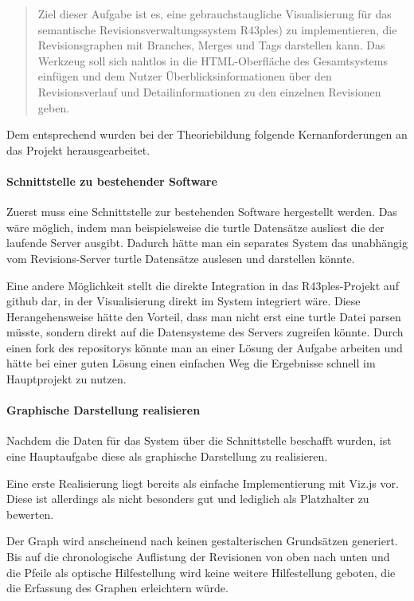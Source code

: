 \documentclass[color, ddc]{tudscrreprt}
\begin{document}
\begin{quotation}
Ziel dieser Aufgabe ist es, eine gebrauchstaugliche Visualisierung für das semantische Revisionsverwaltungssystem R43ples) zu implementieren, die Revisionsgraphen mit Branches, Merges und Tags darstellen kann. Das Werkzeug soll sich nahtlos in die HTML-Oberfläche des Gesamtsystems einfügen und dem Nutzer Überblicksinformationen über den Revisionsverlauf und Detailinformationen zu den einzelnen Revisionen geben.
\end{quotation}

Dem entsprechend wurden bei der Theoriebildung folgende Kernanforderungen an das Projekt herausgearbeitet.

\paragraph{Schnittstelle zu bestehender Software}

Zuerst muss eine Schnittstelle zur bestehenden Software hergestellt werden. Das wäre möglich, indem man beispielsweise die turtle Datensätze ausliest die der laufende Server ausgibt. Dadurch hätte man ein separates System das unabhängig vom Revisions-Server turtle Datensätze auslesen und darstellen könnte.

Eine andere Möglichkeit stellt die direkte Integration in das R43ples-Projekt auf github dar, in der Visualisierung direkt im System integriert wäre. Diese Herangehensweise hätte den Vorteil, dass man nicht erst eine turtle Datei parsen müsste, sondern direkt auf die Datensysteme des Servers zugreifen könnte. Durch einen fork des repositorys könnte man an einer Lösung der Aufgabe arbeiten und hätte bei einer guten Lösung einen einfachen Weg die Ergebnisse schnell im Hauptprojekt zu nutzen.

\paragraph{Graphische Darstellung realisieren}

Nachdem die Daten für das System über die Schnittstelle beschafft wurden, ist eine Hauptaufgabe diese als graphische Darstellung zu realisieren.

Eine erste Realisierung liegt bereits als einfache Implementierung mit Viz.js vor. 
Diese ist allerdings als nicht besonders gut und lediglich als Platzhalter zu bewerten.

Der Graph wird anscheinend nach keinen gestalterischen Grundsätzen generiert. Bis auf die chronologische Auflistung der Revisionen von oben nach unten und die Pfeile als optische Hilfestellung wird keine weitere Hilfestellung geboten, die die Erfassung des Graphen erleichtern würde.
\end{document}
